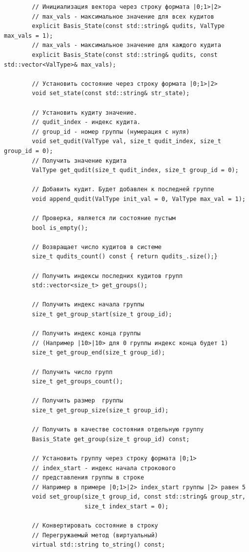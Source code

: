 \documentclass[12pt,fleqn]{article}
\begin{document}
\begin{mdframed}[linecolor=black, topline=true, bottomline=true,
    leftline=false, rightline=false]
\begin{verbatim}
        // Инициализация вектора через строку формата |0;1>|2>
        // max_vals - максимальное значение для всех кудитов
        explicit Basis_State(const std::string& qudits, ValType max_vals = 1);
        // max_vals - максимальное значение для каждого кудита
        explicit Basis_State(const std::string& qudits, const std::vector<ValType>& max_vals);

        // Установить состояние через строку формата |0;1>|2>
        void set_state(const std::string& str_state);

        // Установить кудиту значение. 
        // qudit_index - индекс кудита. 
        // group_id - номер группы (нумерация с нуля)
        void set_qudit(ValType val, size_t qudit_index, size_t group_id = 0);
        // Получить значение кудита
        ValType get_qudit(size_t qudit_index, size_t group_id = 0);

        // Добавить кудит. Будет добавлен к последней группе
        void append_qudit(ValType init_val = 0, ValType max_val = 1);

        // Проверка, является ли состояние пустым
        bool is_empty();

        // Возвращает число кудитов в системе
        size_t qudits_count() const { return qudits_.size();}

        // Получить индексы последних кудитов групп
        std::vector<size_t> get_groups();

        // Получить индекс начала группы
        size_t get_group_start(size_t group_id);

        // Получить индекс конца группы 
        // (Например |10>|10> для 0 группы индекс конца будет 1)
        size_t get_group_end(size_t group_id);

        // Получить число групп
        size_t get_groups_count();

        // Получить размер  группы
        size_t get_group_size(size_t group_id);

        // Получить в качестве состояния отдельную группу
        Basis_State get_group(size_t group_id) const;

        // Установить группу через строку формата |0;1>
        // index_start - индекс начала строкового
        // представления группы в строке
        // Например в примере |0;1>|2> index_start группы |2> равен 5
        void set_group(size_t group_id, const std::string& group_str,
                       size_t index_start = 0);

        // Конвертировать состояние в строку
        // Перегружаемый метод (виртуальный)
        virtual std::string to_string() const;


\end{verbatim}
\end{mdframed}
\end{document}
